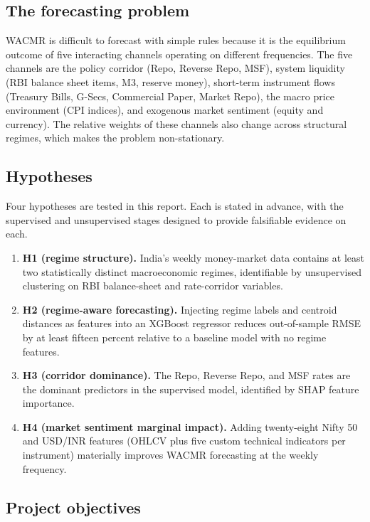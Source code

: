 \subsection{The forecasting problem}

WACMR is difficult to forecast with simple rules because it is the
equilibrium outcome of five interacting channels operating on different
frequencies. The five channels are the policy corridor (Repo, Reverse
Repo, MSF), system liquidity (RBI balance sheet items, M3, reserve
money), short-term instrument flows (Treasury Bills, G-Secs, Commercial
Paper, Market Repo), the macro price environment (CPI indices), and
exogenous market sentiment (equity and currency). The relative weights
of these channels also change across structural regimes, which makes
the problem non-stationary.

\newpage

\subsection{Hypotheses}

Four hypotheses are tested in this report. Each is stated in advance,
with the supervised and unsupervised stages designed to provide
falsifiable evidence on each.

\begin{enumerate}
\item \textbf{H1 (regime structure).} India's weekly money-market data
  contains at least two statistically distinct macroeconomic regimes,
  identifiable by unsupervised clustering on RBI balance-sheet and
  rate-corridor variables.
\item \textbf{H2 (regime-aware forecasting).} Injecting regime labels
  and centroid distances as features into an XGBoost regressor reduces
  out-of-sample RMSE by at least fifteen percent relative to a baseline
  model with no regime features.
\item \textbf{H3 (corridor dominance).} The Repo, Reverse Repo, and MSF
  rates are the dominant predictors in the supervised model, identified
  by SHAP feature importance.
\item \textbf{H4 (market sentiment marginal impact).} Adding twenty-eight
  Nifty 50 and USD/INR features (OHLCV plus five custom technical
  indicators per instrument) materially improves WACMR forecasting at
  the weekly frequency.
\end{enumerate}

\subsection{Project objectives}

